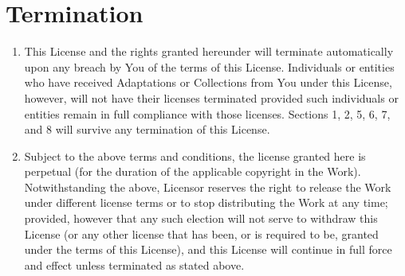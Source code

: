 \documentclass[10pt]{book}
\begin{document}
\section{ Termination}
\begin{enumerate}
	\item This License and the rights granted hereunder will           terminate automatically upon any breach by You of the           terms of this License. Individuals or entities who have           received Adaptations or Collections from You under this           License, however, will not have their licenses terminated           provided such individuals or entities remain in full           compliance with those licenses. Sections 1, 2, 5, 6, 7,           and 8 will survive any termination of this License.
	\item Subject to the above terms and conditions, the           license granted here is perpetual (for the duration of           the applicable copyright in the Work). Notwithstanding           the above, Licensor reserves the right to release the           Work under different license terms or to stop           distributing the Work at any time; provided, however that           any such election will not serve to withdraw this License           (or any other license that has been, or is required to           be, granted under the terms of this License), and this           License will continue in full force and effect unless           terminated as stated above.
\end{enumerate}
\end{document}
